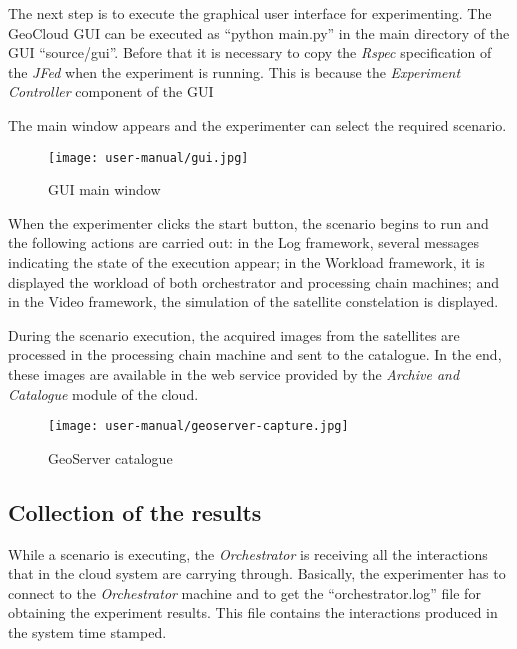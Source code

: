 The next step is to execute the graphical user interface for experimenting. The
GeoCloud \ac{GUI} can be executed as ``python main.py'' in the main directory of
the \ac{GUI} ``source/gui''. Before that it is necessary to copy the
\emph{Rspec} specification of the \emph{JFed} when the experiment is
running. This is because the \emph{Experiment Controller} component of the
\ac{GUI} 

The main window appears and the experimenter can select the required scenario.
\begin{figure}[!h]
\begin{center}
\texttt{[image: user-manual/gui.jpg]}
\caption{GUI main window}
\label{fig:gui}
\end{center}
\end{figure}

When the experimenter clicks the start button, the scenario begins to run and
the following actions are carried out: in the Log framework, several messages indicating the state of the execution
appear; in the Workload framework, it is displayed the workload of both orchestrator and
processing chain machines; and in the Video framework, the simulation of the
satellite constelation is displayed.

During the scenario execution, the acquired images from the satellites are processed
in the processing chain machine and sent to the catalogue. 
In the end, these images are available
in the web service provided by the \emph{Archive and Catalogue} module of the
cloud. 


\begin{figure}[!h]
\begin{center}
\texttt{[image: user-manual/geoserver-capture.jpg]}
\caption{GeoServer catalogue}
\label{fig:images-catalogued}
\end{center}
\end{figure}


\subsection{Collection of the results}

While a scenario is executing, the \emph{Orchestrator} is receiving all the
interactions that in the cloud system are carrying through. 
Basically, the experimenter has to connect to the \emph{Orchestrator} machine
and to get the ``orchestrator.log'' file for obtaining the experiment results.
This file contains the interactions produced in the system time stamped.